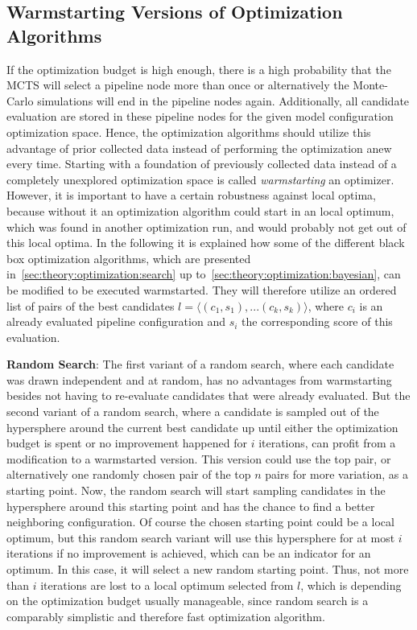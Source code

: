 \subsection{Warmstarting Versions of Optimization Algorithms}
\label{sec:approach:configuration:warmstart}
If the optimization budget is high enough, there is a high probability that the MCTS will select a pipeline node more than once or alternatively the Monte-Carlo simulations will end in the pipeline nodes again.
Additionally, all candidate evaluation are stored in these pipeline nodes for the given model configuration optimization space.
Hence, the optimization algorithms should utilize this advantage of prior collected data instead of performing the optimization anew every time.\newline
Starting with a foundation of previously collected data instead of a completely unexplored optimization space is called \textit{warmstarting} an optimizer.
However, it is important to have a certain robustness against local optima, because without it an optimization algorithm could start in an local optimum, which was found in another optimization run, and would probably not get out of this local optima.
In the following it is explained how some of the different black box optimization algorithms, which are presented in~\ref{sec:theory:optimization:search} up to~\ref{sec:theory:optimization:bayesian}, can be modified to be executed warmstarted.
They will therefore utilize an ordered list of pairs of the best candidates $l = \langle (c_1, s_1), ... (c_k, s_k) \rangle$, where $c_i$ is an already evaluated pipeline configuration and $s_i$ the corresponding score of this evaluation.

\textbf{Random Search}:
The first variant of a random search, where each candidate was drawn independent and at random, has no advantages from warmstarting besides not having to re-evaluate candidates that were already evaluated.\newline
But the second variant of a random search, where a candidate is sampled out of the hypersphere around the current best candidate up until either the optimization budget is spent or no improvement happened for $i$ iterations, can profit from a modification to a warmstarted version.
This version could use the top pair, or alternatively one randomly chosen pair of the top $n$ pairs for more variation, as a starting point.
Now, the random search will start sampling candidates in the hypersphere around this starting point and has the chance to find a better neighboring configuration.\newline
Of course the chosen starting point could be a local optimum, but this random search variant will use this hypersphere for at most $i$ iterations if no improvement is achieved, which can be an indicator for an optimum.
In this case, it will select a new random starting point.
Thus, not more than $i$ iterations are lost to a local optimum selected from $l$, which is depending on the optimization budget usually manageable, since random search is a comparably simplistic and therefore fast optimization algorithm.

